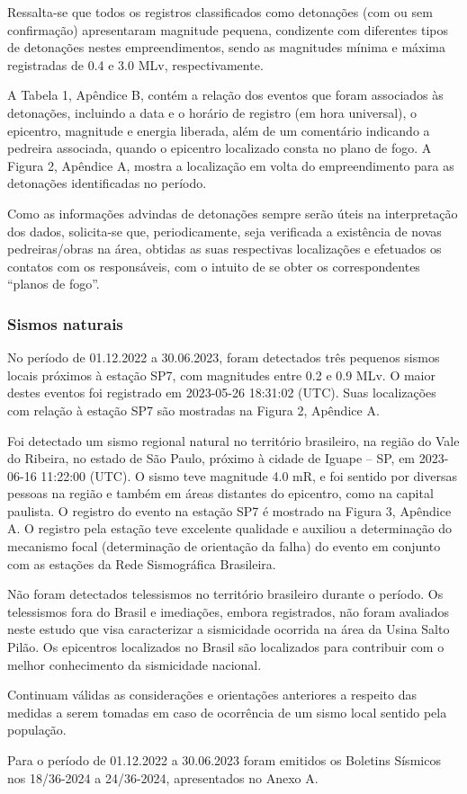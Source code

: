 \par{Ressalta-se que todos os registros classificados como detonações (com ou sem confirmação) apresentaram magnitude pequena, condizente com diferentes tipos de detonações nestes empreendimentos, sendo as magnitudes mínima e máxima registradas de 0.4 e 3.0 MLv, respectivamente.}
\par{A Tabela 1, Apêndice B, contém a relação dos eventos que foram associados às detonações, incluindo a data e o horário de registro (em hora universal), o epicentro, magnitude e energia liberada, além de um comentário indicando a pedreira associada, quando o epicentro localizado consta no plano de fogo. A Figura 2, Apêndice A, mostra a localização em volta do empreendimento para as detonações identificadas no período.}
\par{Como as informações advindas de detonações sempre serão úteis na interpretação dos dados, solicita-se que, periodicamente, seja verificada a existência de novas pedreiras/obras na área, obtidas as suas respectivas localizações e efetuados os contatos com os responsáveis, com o intuito de se obter os correspondentes “planos de fogo”.}

\subsubsection{Sismos naturais}
\par{No período de 01.12.2022 a 30.06.2023, foram detectados três pequenos sismos locais próximos à estação SP7, com magnitudes entre 0.2 e 0.9 MLv. O maior destes eventos foi registrado em 2023-05-26 18:31:02 (UTC). Suas localizações com relação à estação SP7 são mostradas na Figura 2, Apêndice A.}
\par{Foi detectado um sismo regional natural no território brasileiro, na região do Vale do Ribeira, no estado de São Paulo, próximo à cidade de Iguape – SP, em 2023-06-16 11:22:00 (UTC). O sismo teve magnitude 4.0 mR, e foi sentido por diversas pessoas na região e também em áreas distantes do epicentro, como na capital paulista. O registro do evento na estação SP7 é mostrado na Figura 3, Apêndice A. O registro pela estação teve excelente qualidade e auxiliou a determinação do mecanismo focal (determinação de orientação da falha) do evento em conjunto com as estações da Rede Sismográfica Brasileira.}
\par{Não foram detectados telessismos no território brasileiro durante o período. Os telessismos fora do Brasil e imediações, embora registrados, não foram avaliados neste estudo que visa caracterizar a sismicidade ocorrida na área da Usina Salto Pilão. Os epicentros localizados no Brasil são localizados para contribuir com o melhor conhecimento da sismicidade nacional.}
\par{Continuam válidas as considerações e orientações anteriores a respeito das medidas a serem tomadas em caso de ocorrência de um sismo local sentido pela população.}
\par{Para o período de 01.12.2022 a 30.06.2023 foram emitidos os Boletins Sísmicos nos 18/36-2024 a 24/36-2024, apresentados no Anexo A.}

